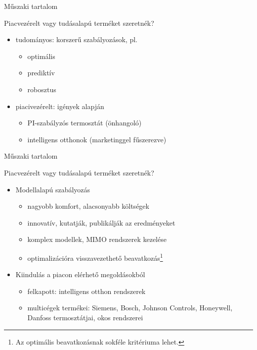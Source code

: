 \documentclass[14pt,handout]{beamer}
\begin{document}
\begin{frame}{Műszaki tartalom}

Piacvezérelt vagy tudásalapú terméket szeretnék?

\begin{itemize}
	\setlength{\itemsep}{7pt}
	\item tudományos: korszerű szabályozások, pl.
	\begin{itemize}
		\item optimális
		\item prediktív
		\item robosztus%
	\end{itemize}
	\item piacivezérelt: igények alapján
	\begin{itemize}
		\item PI-szabályzós termosztát (önhangoló)
		\item intelligens otthonok (marketinggel fűszerezve)
	\end{itemize}
\end{itemize}
\end{frame}



\begin{frame}{Műszaki tartalom}

Piacvezérelt vagy tudásalapú terméket szeretnék?

\begin{itemize}
	\setlength{\itemsep}{7pt}
	\item Modellalapú szabályozás
	\begin{itemize}
		\item nagyobb komfort, alacsonyabb költségek
		\item innovatív, kutatják, publikálják az eredményeket
		\item komplex modellek, MIMO rendszerek kezelése
		\item optimalizációra visszavezethető beavatkozás\footnote{Az optimális beavatkozásnak sokféle kritériuma lehet.}
	\end{itemize}
	\item Kiindulás a piacon elérhető megoldásokból
	\begin{itemize}
		\item felkapott: intelligens otthon rendszerek
		\item multicégek termékei: Siemens, Bosch, Johnson Controls, Honeywell, Danfoss termosztátjai, okos rendszerei
	\end{itemize}
\end{itemize}
\end{frame}
\end{document}
